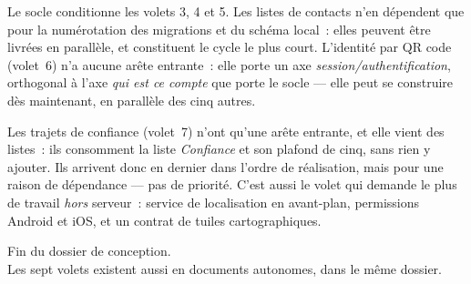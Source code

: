 \documentclass[11pt,a4paper,oneside]{report}
\begin{document}
\begin{center}
\end{center}

Le socle conditionne les volets 3, 4 et 5. Les listes de contacts n'en dépendent que pour la
numérotation des migrations et du schéma local~: elles peuvent être livrées en parallèle, et
constituent le cycle le plus court. L'identité par QR code (volet~6) n'a aucune arête entrante~:
elle porte un axe \emph{session/authentification}, orthogonal à l'axe \emph{qui est ce
compte} que porte le socle --- elle peut se construire dès maintenant, en parallèle des cinq
autres.

Les trajets de confiance (volet~7) n'ont qu'une arête entrante, et elle vient des listes~:
ils consomment la liste \emph{Confiance} et son plafond de cinq, sans rien y ajouter. Ils
arrivent donc en dernier dans l'ordre de réalisation, mais pour une raison de dépendance
--- pas de priorité. C'est aussi le volet qui demande le plus de travail \emph{hors}
serveur~: service de localisation en avant-plan, permissions Android et iOS, et un contrat
de tuiles cartographiques.

\vfill
\begin{center}\small\color{AlanyaGray}\sffamily
Fin du dossier de conception. \\
Les sept volets existent aussi en documents autonomes, dans le même dossier.
\end{center}
\end{document}
